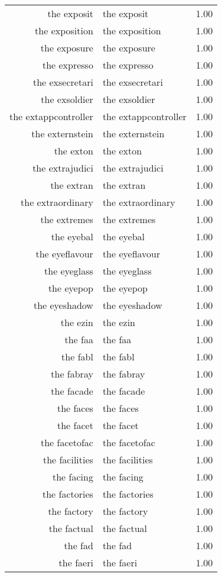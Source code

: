 \begin{table}[ht]
\begin{tabular}{rlr}
  the exposit & the exposit & 1.00 \\ 
  the exposition & the exposition & 1.00 \\ 
  the exposure & the exposure & 1.00 \\ 
  the expresso & the expresso & 1.00 \\ 
  the exsecretari & the exsecretari & 1.00 \\ 
  the exsoldier & the exsoldier & 1.00 \\ 
  the extappcontroller & the extappcontroller & 1.00 \\ 
  the externstein & the externstein & 1.00 \\ 
  the exton & the exton & 1.00 \\ 
  the extrajudici & the extrajudici & 1.00 \\ 
  the extran & the extran & 1.00 \\ 
  the extraordinary & the extraordinary & 1.00 \\ 
  the extremes & the extremes & 1.00 \\ 
  the eyebal & the eyebal & 1.00 \\ 
  the eyeflavour & the eyeflavour & 1.00 \\ 
  the eyeglass & the eyeglass & 1.00 \\ 
  the eyepop & the eyepop & 1.00 \\ 
  the eyeshadow & the eyeshadow & 1.00 \\ 
  the ezin & the ezin & 1.00 \\ 
  the faa & the faa & 1.00 \\ 
  the fabl & the fabl & 1.00 \\ 
  the fabray & the fabray & 1.00 \\ 
  the facade & the facade & 1.00 \\ 
  the faces & the faces & 1.00 \\ 
  the facet & the facet & 1.00 \\ 
  the facetofac & the facetofac & 1.00 \\ 
  the facilities & the facilities & 1.00 \\ 
  the facing & the facing & 1.00 \\ 
  the factories & the factories & 1.00 \\ 
  the factory & the factory & 1.00 \\ 
  the factual & the factual & 1.00 \\ 
  the fad & the fad & 1.00 \\ 
  the faeri & the faeri & 1.00 \\ 

\end{tabular}
\end{table}
